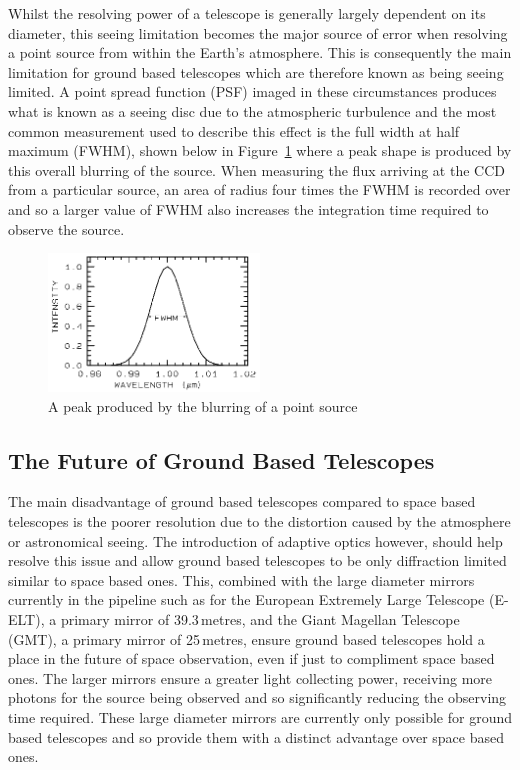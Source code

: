 		Whilst the resolving power of a telescope is generally largely dependent on its diameter, this seeing limitation becomes the major source of error when resolving a point source from within the Earth's atmosphere. This is consequently the main limitation for ground based telescopes which are therefore known as being seeing limited. A point spread function (PSF) imaged in these circumstances produces what is known as a seeing disc due to the atmospheric turbulence and the most common measurement used to describe this effect is the full width at half maximum (FWHM), shown below in Figure~\ref{fig:FWHM} where a peak shape is produced by this overall blurring of the source. When measuring the flux arriving at the CCD from a particular source, an area of radius four times the FWHM is recorded over and so a larger value of FWHM also increases the integration time required to observe the source.
		\begin{figure}[!htbp]
			\centering
			\includegraphics[width=0.5\textwidth]{../Images/FWHM.png}
			\caption{A peak produced by the blurring of a point source}\label{fig:FWHM}
		\end{figure}

	\subsection{The Future of Ground Based Telescopes} %
	\label{sub:the_future_of_ground_based_telescopes}
		The main disadvantage of ground based telescopes compared to space based telescopes is the poorer resolution due to the distortion caused by the atmosphere or astronomical seeing. The introduction of adaptive optics however, should help resolve this issue and allow ground based telescopes to be only diffraction limited similar to space based ones. This, combined with the large diameter mirrors currently in the pipeline such as for the European Extremely Large Telescope (E-ELT), a primary mirror of 39.3\,metres, and the Giant Magellan Telescope (GMT), a primary mirror of 25\,metres, ensure ground based telescopes hold a place in the future of space observation, even if just to compliment space based ones. The larger mirrors ensure a greater light collecting power, receiving more photons for the source being observed and so significantly reducing the observing time required. These large diameter mirrors are currently only possible for ground based telescopes and so provide them with a distinct advantage over space based ones.


